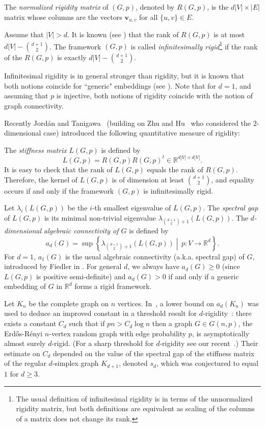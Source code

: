\documentclass[a4paper,11pt]{article}
\theoremstyle{plain}
\theoremstyle{definition}
\newcommand{\Rea}{{\mathbb R}}
\newcommand{\bv}{\mathbf v}
\begin{document}
The \emph{normalized rigidity matrix} of $(G,p)$, denoted by $R(G,p)$, is the $d|V|\times |E|$ matrix whose columns are the vectors $\bv_{u,v}$ for all $\{u,v\}\in E$.

Assume that $|V|>d$. 
It is known (see \cite{AR1}) that the rank of $R(G,p)$ is at most $d|V|-\binom{d+1}{2}$. The framework $(G,p)$ is called \emph{infinitesimally rigid}\footnote{The usual definition of infinitesimal rigidity is in terms of the unnormalized rigidity matrix, but both definitions are equivalent as scaling of the columns of a matrix does not change its rank.} if the rank of the $R(G,p)$ is exactly 
$d|V|-\binom{d+1}{2}$. %

Infinitesimal rigidity is in general stronger than rigidity, but it is known that both notions coincide for ``generic" embeddings (see \cite{AR1}). Note that for $d=1$, and assuming that $p$ is injective, both notions of rigidity coincide with the notion of graph connectivity.

Recently Jord\'an and Tanigawa~\cite{jordan2020rigidity} (building on Zhu and Hu~\cite{zhu2013quantitative,zhu2009stiffness} who considered the $2$-dimensional case) introduced the following quantitative measure of rigidity:


The \emph{stiffness matrix} $L(G,p)$ is defined by
\[
    L(G,p)=R(G,p) R(G,p)^t \in \Rea^{d|V|\times d|V|}.
\] 
It is easy to check that the rank of $L(G,p)$ equals the rank of $R(G,p)$. Therefore, the kernel of $L(G,p)$ is of dimension at least $\binom{d+1}{2}$, and equality occurs if and only if the framework $(G,p)$ is infinitesimally rigid.

Let $\lambda_i(L(G,p))$ be the $i$-th smallest eigenvalue of $L(G,p)$. The \emph{spectral gap} of  $L(G,p)$ is its minimal non-trivial eigenvalue  $\lambda_{\binom{d+1}{2}+1}(L(G,p))$.
The \emph{$d$-dimensional algebraic connectivity of $G$} is defined by \[
a_d(G)=\sup\left\{ \lambda_{\binom{d+1}{2}+1}(L(G,p)) \middle| \, p: V\to \Rea^d\right\}.
\]
For $d=1$, $a_1(G)$ is the usual algebraic connectivity (a.k.a. spectral gap) of $G$, introduced by Fiedler in \cite{fiedler1973algebraic}.
For general $d$, we always have $a_d(G) \ge 0$ (since $L(G,p)$ is positive semi-definite) and $a_d(G)>0$ if and only if
a generic embedding of $G$ in $\Rea^d$ forms a rigid framework.

Let $K_n$ be the complete graph on $n$ vertices.
In~\cite{jordan2020rigidity}, a lower bound on $a_d(K_n)$ was used to deduce an improved constant in a threshold result for $d$-rigidity~\cite{kiraly2013coherence}: there exists a constant $C_d$ such that if $pn > C_d \log n$ then a graph $G\in G(n,p)$, the Erd\H{o}s-R\'enyi $n$-vertex random graph with edge probability $p$, is asymptotically almost surely $d$-rigid. 
(For a sharp threshold for $d$-rigidity  see our recent~\cite{SharpRigidityThreshold}.)
Their estimate on $C_d$ depended on the value of the spectral gap of the stiffness matrix of the regular $d$-simplex graph $K_{d+1}$, denoted $s_d$, which was conjectured to equal $1$ for $d\geq 3$.  
\end{document}
